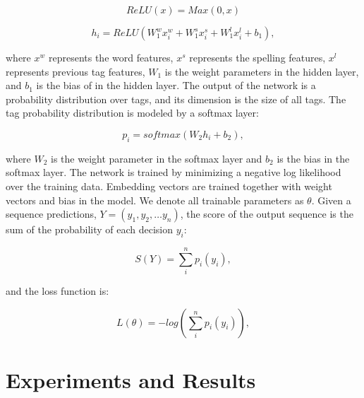\begin{equation}
\textit{ReLU}\left(x\right) = \textit{Max}\left(0,x\right)
\end{equation}

\begin{equation}
h_{i}=\textit{ReLU}\left( W_{1}^{w}x_{i}^{w}+W_{1}^{s}x_{i}^{s}+W_{1}^{l}x_{i}^{l}+b_{1}\right),
\end{equation}

\noindent
where $x^{w}$ represents the word features, $x^{s}$ represents the spelling features, $x^{l}$ represents previous tag features, $W_{1}$ is the weight parameters in the hidden layer, and $b_{1}$ is the bias of in the hidden layer. The output of the network is a probability distribution over tags, and its dimension is the size of all tags. The tag probability distribution is modeled by a softmax layer:

\begin{equation}
p_{i}=\textit{softmax}\left(W_{2}h_{i}+b_{2}\right),
\end{equation}

\noindent
where $W_{2}$ is the weight parameter in the softmax layer and $b_{2}$ is the bias in the softmax layer. The network is trained by minimizing a negative log likelihood over the training data. Embedding vectors are trained together with weight vectors and bias in the model. We denote all trainable parameters as $\theta$. Given a sequence predictions, $Y=\left( y_{1},y_{2},\ldots y_{n}\right)$,
the score of the output sequence is the sum of the probability of each decision $y_{i}$: 

\begin{equation}
S\left( Y\right) = \sum _{i}^{n}p_{i}\left(y_{i}\right),
\end{equation}

\noindent
and the loss function is:

\begin{equation}
L\left(\theta\right) = -log\left(\sum _{i}^{n}p_{i}\left(y_{i}\right)\right),
\end{equation}

\section{Experiments and Results}

